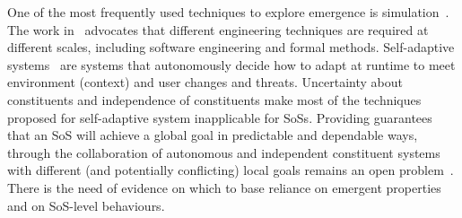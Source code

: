 One of the most frequently used techniques to explore emergence is simulation~\cite{DeWolf2005}. The work in~\cite{Zambonelli04} advocates that different engineering techniques are required at different scales,
including software engineering and formal methods. Self-adaptive systems~\cite{de2013software,Author:2009tt,Salehie2009} are systems that autonomously
decide how to adapt at runtime to meet environment (context) and user changes and threats. Uncertainty about
constituents and independence of constituents make most of the techniques proposed for self-adaptive system
inapplicable for SoSs. Providing guarantees that an SoS will achieve a global goal in predictable and dependable
ways, through the collaboration of autonomous and independent constituent systems with different (and
potentially conflicting) local goals remains an open problem~\cite{Delgado2004,Leucker2009293,ZHANG20185}. There is the need of evidence on which
to base reliance on emergent properties and on SoS-level behaviours.

 










